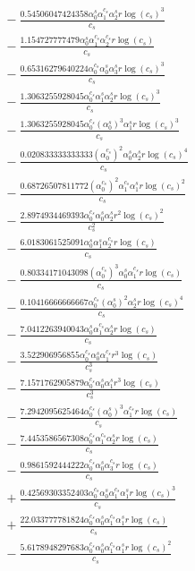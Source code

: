 \documentclass[10pt]{article}
\begin{document}
\begin{align*}
&{}  - \frac{0.54506047424358 \alpha_{0}^s \alpha_{1}^{c_s} \alpha_{2}^s r \log{\left(c_{s} \right)}^{3}}{c_{s}} \\
&{}  - \frac{1.154727777479 \alpha_{0}^s \alpha_{1}^{c_s} \alpha_{2}^{c_s} r \log{\left(c_{s} \right)}}{c_{s}} \\
&{}  - \frac{0.65316279640224 \alpha_{0}^{c_s} \alpha_{0}^s \alpha_{3}^s r \log{\left(c_{s} \right)}^{3}}{c_{s}} \\
&{}  - \frac{1.3063255928045 \alpha_{0}^{c_s} \alpha_{1}^s \alpha_{2}^s r \log{\left(c_{s} \right)}^{3}}{c_{s}} \\
&{}  - \frac{1.3063255928045 \alpha_{0}^{c_s} \left(\alpha_{0}^s\right)^{3} \alpha_{1}^s r \log{\left(c_{s} \right)}^{3}}{c_{s}} \\
&{}  - \frac{0.020833333333333 \left(\alpha_{0}^{c_s}\right)^{2} \alpha_{0}^s \alpha_{2}^s r \log{\left(c_{s} \right)}^{4}}{c_{s}} \\
&{}  - \frac{0.68726507811772 \left(\alpha_{0}^{c_s}\right)^{2} \alpha_{1}^{c_s} \alpha_{1}^s r \log{\left(c_{s} \right)}^{2}}{c_{s}} \\
&{}  - \frac{2.8974934469393 \alpha_{0}^{c_s} \alpha_{0}^s \alpha_{2}^s r^{2} \log{\left(c_{s} \right)}^{2}}{c_{s}^{2}} \\
&{}  - \frac{6.0183061525091 \alpha_{0}^s \alpha_{1}^s \alpha_{2}^{c_s} r \log{\left(c_{s} \right)}}{c_{s}} \\
&{}  - \frac{0.80334171043098 \left(\alpha_{0}^{c_s}\right)^{3} \alpha_{0}^s \alpha_{1}^{c_s} r \log{\left(c_{s} \right)}}{c_{s}} \\
&{}  - \frac{0.10416666666667 \alpha_{0}^{c_s} \left(\alpha_{0}^s\right)^{2} \alpha_{2}^s r \log{\left(c_{s} \right)}^{4}}{c_{s}} \\
&{}  - \frac{7.0412263940043 \alpha_{0}^s \alpha_{1}^{c_s} \alpha_{2}^s r \log{\left(c_{s} \right)}}{c_{s}} \\
&{}  - \frac{3.522906956855 \alpha_{0}^{c_s} \alpha_{0}^s \alpha_{1}^{c_s} r^{3} \log{\left(c_{s} \right)}}{c_{s}^{3}} \\
&{}  - \frac{7.1571762905879 \alpha_{0}^{c_s} \alpha_{0}^s \alpha_{1}^s r^{3} \log{\left(c_{s} \right)}}{c_{s}^{3}} \\
&{}  - \frac{7.2942095625464 \alpha_{0}^{c_s} \left(\alpha_{0}^s\right)^{3} \alpha_{1}^{c_s} r \log{\left(c_{s} \right)}}{c_{s}} \\
&{}  - \frac{7.4453586567308 \alpha_{0}^{c_s} \alpha_{1}^{c_s} \alpha_{2}^s r \log{\left(c_{s} \right)}}{c_{s}} \\
&{}  - \frac{0.9861592444222 \alpha_{0}^{c_s} \alpha_{0}^s \alpha_{3}^{c_s} r \log{\left(c_{s} \right)}}{c_{s}} \\
&{}  + \frac{0.42569303352403 \alpha_{0}^{c_s} \alpha_{0}^s \alpha_{1}^{c_s} \alpha_{1}^s r \log{\left(c_{s} \right)}^{3}}{c_{s}} \\
&{}  + \frac{22.033777781824 \alpha_{0}^{c_s} \alpha_{0}^s \alpha_{1}^{c_s} \alpha_{1}^s r \log{\left(c_{s} \right)}}{c_{s}} \\
&{}  - \frac{5.6178948297683 \alpha_{0}^{c_s} \alpha_{0}^s \alpha_{1}^{c_s} \alpha_{1}^s r \log{\left(c_{s} \right)}^{2}}{c_{s}}
\end{align*}
\end{document}
